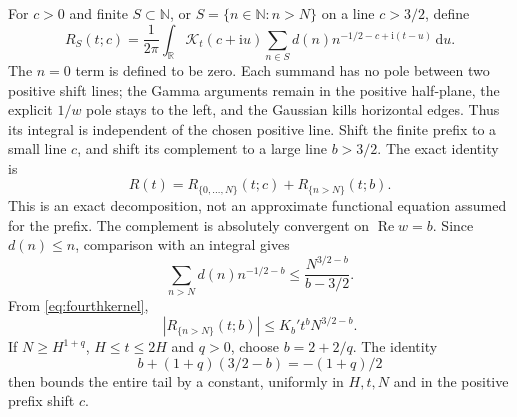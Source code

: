 \documentclass[11pt,a4paper]{article}
\numberwithin{equation}{section}
\theoremstyle{definition}
\newcommand{\R}{\mathbb R}
\newcommand{\N}{\mathbb N}
\newcommand{\dd}{\,\mathrm d}
\newcommand{\ii}{\mathrm i}
\newcommand{\Rea}{\operatorname{Re}}
\begin{document}
For $c>0$ and finite $S\subset\N$, or $S=\{n\in\N:n>N\}$ on a line $c>3/2$, define
\[
 R_S(t;c)=\frac1{2\pi}\int_{\R}\mathcal K_t(c+\ii u)
       \sum_{n\in S}d(n)n^{-1/2-c+\ii(t-u)}\dd u.
\]
The $n=0$ term is defined to be zero. Each summand has no pole between two
positive shift lines; the Gamma arguments remain in the positive half-plane,
the explicit $1/w$ pole stays to the left, and the Gaussian kills horizontal
edges. Thus its integral is independent of the chosen positive line. Shift the
finite prefix to a small line $c$, and shift its complement to a large line
$b>3/2$. The exact identity is
\[
 R(t)=R_{\{0,\ldots,N\}}(t;c)+R_{\{n>N\}}(t;b).
\]
This is an exact decomposition, not an approximate functional
equation assumed for the prefix. The complement is absolutely convergent on
$\Rea w=b$. Since $d(n)\le n$, comparison with an integral gives
\[
 \sum_{n>N}d(n)n^{-1/2-b}
 \le\frac{N^{3/2-b}}{b-3/2}.
\]
From \eqref{eq:fourthkernel},
\[
 |R_{\{n>N\}}(t;b)|\le K_b' t^bN^{3/2-b}.
\]
If $N\ge H^{1+q}$, $H\le t\le2H$ and $q>0$, choose
$b=2+2/q$. The identity
\[
 b+(1+q)(3/2-b)=-(1+q)/2
\]
then bounds the entire tail by a constant, uniformly in $H,t,N$ and in the
positive prefix shift $c$.
\end{document}
